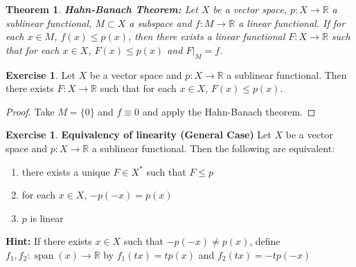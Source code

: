 \documentclass[12pt]{amsart}
\newtheorem{thm}{Theorem}[subsection]
\theoremstyle{definition}
\theoremstyle{remark}
\theoremstyle{definition}
\newtheorem{ex}[definition]{Exercise}
\newcommand{\R}{\mathbb{R}}
\DeclareMathOperator{\spn}{span}
\begin{document}
	\begin{thm}\textbf{Hahn-Banach Theorem:}
		Let $X$ be a vector space, $p:X \rightarrow \R$ a sublinear functional, $M \subset X$ a subspace and $f:M \rightarrow \R$ a linear functional. If for each $x \in M$, $ f(x)  \leq p(x)$, then there exists a linear functional $F:X \rightarrow \R$ such that for each $x \in X$, $F(x) \leq p(x)$ and $F|_{M}=f$.
	\end{thm}
	
	\begin{ex}
	Let $X$ be a vector space and $p:X \rightarrow \R$ a sublinear functional. Then there exists $F: X \rightarrow \R$ such that for each $x \in X$, $F(x) \leq p(x)$.
	\end{ex}
	
	\begin{proof}
	Take $M = \{0\}$ and $f \equiv 0$ and apply the Hahn-Banach theorem.
	\end{proof}	
	
	\begin{ex}\textbf{Equivalency of linearity (General Case)}
	Let $X$ be a vector space and $p:X \rightarrow \R$ a sublinear functional. Then the following are equivalent:
	\begin{enumerate}
	\item there exists a unique $F \in X^*$ such that $F \leq p$
	\item for each $x \in X$, $-p(-x) = p(x)$
	\item $p$ is linear
\end{enumerate}	
\textbf{Hint:} If there exists $x \in X$ such that $-p(-x) \neq p(x)$, define $f_1,f_2 :\spn(x) \rightarrow \R$ by $f_1(tx) = t p(x)$ and $f_2(tx) = -tp(-x)$
	\end{ex}	
	
\end{document}
